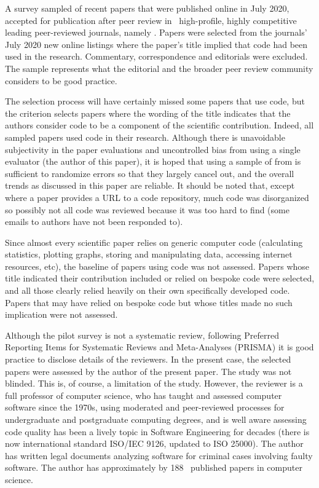 \documentclass[10pt,a4paper]{article}
\begin{document}
\label{data-methods-section}
\label{data-methods-subsection}
A survey sampled of recent papers that were published online in July 2020, accepted for publication after peer review in \the\numberOfJournals\ high-profile, highly competitive leading peer-reviewed journals, namely \journalBreakdown. Papers were selected from the journals' July 2020 new online listings where the paper's title implied that code had been used in the research. Commentary, correspondence and editorials were excluded. The sample represents what the editorial and the broader peer review community considers to be good practice. 

The selection process will have certainly missed some papers that use code, but the criterion selects papers where the wording of the title indicates that the authors consider code to be a component of the scientific contribution. Indeed, all sampled papers used code in their research. Although there is unavoidable subjectivity in the paper evaluations and uncontrolled bias from using a single evaluator (the author of this paper), it is hoped that using a sample of  from  is sufficient to randomize errors so that they largely cancel out, and the overall trends as discussed in this paper are reliable. It should be noted that, except where a paper provides a URL to a code repository, much code was disorganized so possibly not all code was reviewed because it was too hard to find (some emails to authors have not been responded to). 
 
Since almost every scientific paper relies on generic computer code (calculating statistics, plotting graphs, storing and manipulating data, accessing internet resources, etc), the baseline of papers using code was not assessed. Papers whose title indicated their contribution included or relied on bespoke code were selected, and all those clearly relied heavily on their own specifically developed code. Papers that may have relied on bespoke code but whose titles made no such implication were not assessed.

Although the pilot survey is not a systematic review, following Preferred Reporting Items for Systematic Reviews and Meta-Analyses (PRISMA) \cite{prisma} it is good practice to disclose details of the reviewers. In the present case, the selected papers were assessed by the author of the present paper. The study was not blinded. This is, of course, a limitation of the study. However, the reviewer is a full professor of computer science, who has taught and assessed computer software since the 1970s, using moderated and peer-reviewed processes for undergraduate and postgraduate computing degrees, and is well aware assessing code quality has been a lively topic in Software Engineering for decades (there is now international standard ISO/IEC 9126, updated to ISO 25000). The author has written legal documents analyzing software for criminal cases involving faulty software. The author has approximately 
\newcount \papers {} %
\advance \papers by 188 %
\the\papers\ published papers in computer science. 
\end{document}
